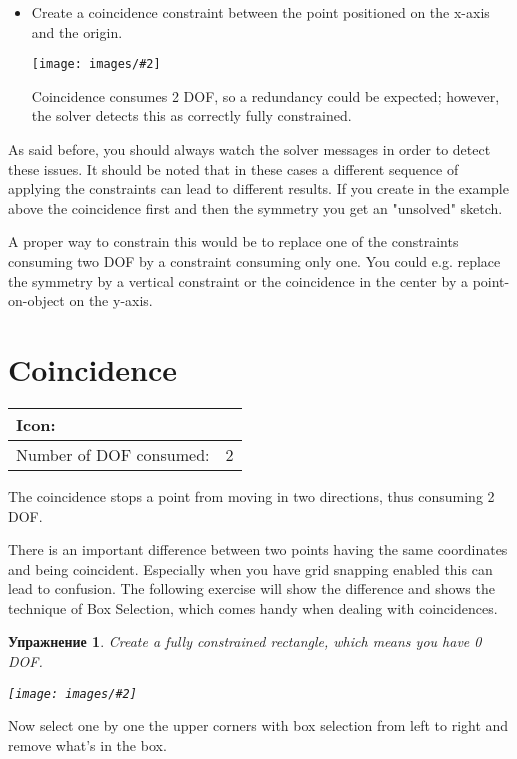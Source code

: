 \documentclass[12pt,titlepage]{article}
\newcommand{\icon}[1]{\raisebox{-1em}{\rule{0pt}{27pt}\texttt{[image: images/\#1]}}}
\newcommand{\img}[2]{\vspace{2ex}\noindent\texttt{[image: images/\#2]}}
\newcommand{\dofConsumed}{Number of DOF consumed:}
\newtheorem{Exercise}{Упражнение}
\begin{document}
\begin {itemize}
\begin{description}
\begin{itemize}
      \item Create a coincidence constraint between the point positioned on
            the x-axis and the origin. 

\img{scale=\scale}{equiTriangle3}

      Coincidence consumes 2 DOF, so a redundancy could be expected; however,
      the solver detects this as correctly fully constrained.
      \end{itemize}

      As said before, you should always watch the solver messages in order to
      detect these issues.
      It should be noted that in these cases a different sequence of applying
      the constraints can lead to different results. If you create in the
      example above the coincidence first and then the symmetry you get an
      "unsolved" sketch.

      A proper way to constrain this would be to replace one of the
      constraints consuming two DOF by a constraint consuming only one.
      You could e.g. replace the symmetry by a vertical constraint or the
      coincidence in the center by a point-on-object on the y-axis.
\end{description}


\section{Coincidence}
\begin{tabular}{|l|l|}
\hline
Icon: & \icon{Constraint_PointOnPoint}\\
\hline
\dofConsumed & 2 \\
\hline
\end{tabular}

The coincidence stops a point from moving in two directions, thus consuming 2 DOF.

There is an important difference between two points having the same
coordinates and being coincident. Especially when you have grid snapping
enabled this can lead to confusion. The following exercise will show the difference
and shows the technique of Box Selection, which comes handy when dealing with
coincidences.

\begin{Exercise}
\label{ExampleBoxSelection}
Create a fully constrained rectangle, which means you have 0 DOF.

\img{}{Coincidence1}
\end{Exercise}
Now select one by one the upper corners with box selection from left to right and
remove what's in the box.


\end{itemize}
\end{document}
